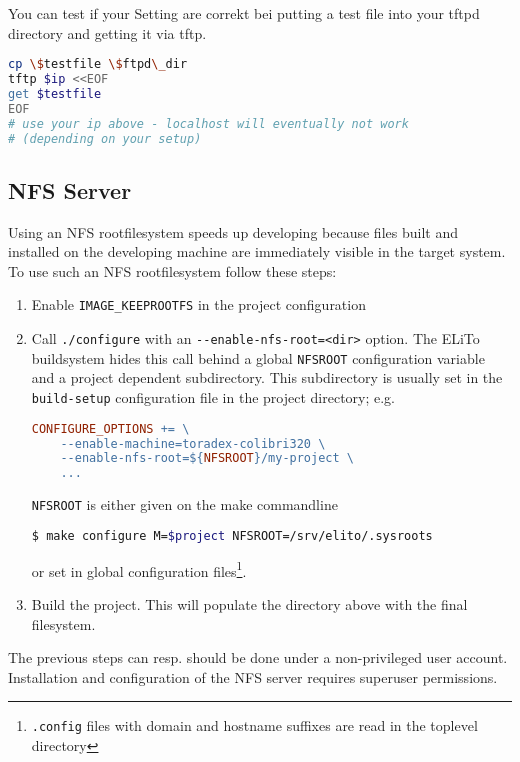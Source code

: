 You can test if your Setting are correkt bei putting a test file into your tftpd directory and getting it via tftp.
\begin{lstlisting}[language=sh]
cp \$testfile \$ftpd\_dir
tftp $ip <<EOF
get $testfile
EOF
# use your ip above - localhost will eventually not work
# (depending on your setup)
\end{lstlisting}

\subsection{NFS Server}
\label{sec:setup_services_nfs-server}

Using an NFS rootfilesystem speeds up developing because files built
and installed on the developing machine are immediately visible in the
target system.  To use such an NFS rootfilesystem follow these steps:

\begin{enumerate}
\item Enable \texttt{IMAGE\_KEEPROOTFS} in the project configuration
\item Call \texttt{./configure} with an
  \texttt{-\mbox{}-enable-nfs-root=<dir>} option. The ELiTo buildsystem hides
  this call behind a global \texttt{NFSROOT} configuration variable
  and a project dependent subdirectory.  This subdirectory is usually
  set in the \texttt{build-setup} configuration file in the project
  directory; e.g.
\begin{lstlisting}[language=make]
CONFIGURE_OPTIONS += \
	--enable-machine=toradex-colibri320 \
	--enable-nfs-root=${NFSROOT}/my-project \
	...
\end{lstlisting}%
  \texttt{NFSROOT} is either given on the make commandline
\begin{lstlisting}[language=bash]
$ make configure M=$project NFSROOT=/srv/elito/.sysroots
\end{lstlisting}
or set in global configuration files\footnote{\texttt{.config} files
  with domain and hostname suffixes are read in the toplevel
  directory}.
\item Build the project. This will populate the directory above with
  the final filesystem.
\end{enumerate}

The previous steps can resp. should be done under a non-privileged
user account.  Installation and configuration of the NFS server
requires superuser permissions.


